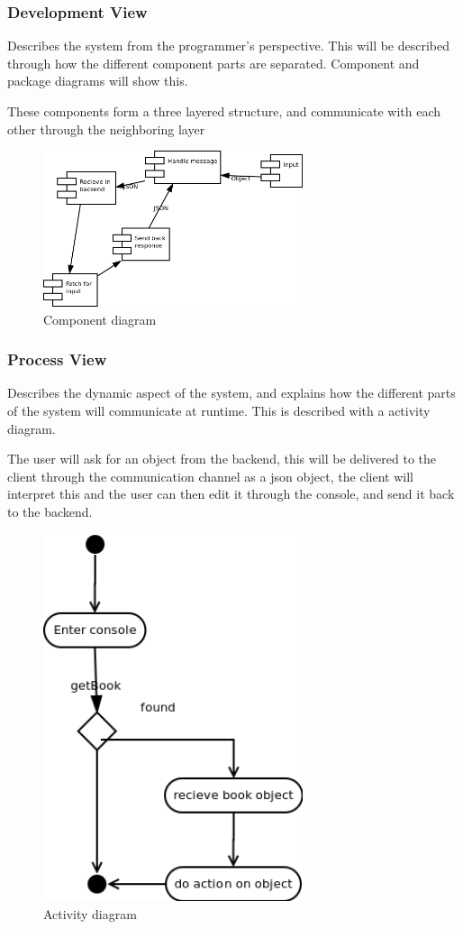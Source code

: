 \subsubsection{Development View}
Describes the system from the programmer's perspective. This will be described through how the different component parts are separated. Component and package diagrams will show this.

These components form a three layered structure, and communicate with each other through the neighboring layer

\begin{figure}
\centering
\includegraphics[width=3in]{image/componentdiagram.png}
\caption{Component diagram}
\end{figure}

\subsubsection{Process View}
Describes the dynamic aspect of the system, and explains how the different parts of the system will communicate at runtime. This is described with a activity diagram.

The user will ask for an object from the backend, this will be delivered to the client through the communication channel as a json object, the client will interpret this and the user can then edit it through the console, and send it back to the backend.

\begin{figure}
\centering
\includegraphics[width=3in]{image/activitydiagram.png}
\caption{Activity diagram}
\end{figure}


